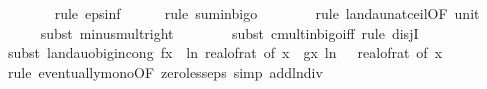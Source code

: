\begin{isabellebody}
\ \ \ \ \ \ \isamarkupfalse%
\ {\isacharparenleft}{\kern0pt}rule\ eps{\isacharunderscore}{\kern0pt}inf{\isacharparenright}{\kern0pt}\isanewline
\ \ \ \ \isamarkupfalse%
\ {\isacharparenleft}{\kern0pt}rule\ sum{\isacharunderscore}{\kern0pt}in{\isacharunderscore}{\kern0pt}bigo{\isacharparenright}{\kern0pt}\isanewline
\ \ \ \ \ \ \isamarkupfalse%
\ {\isacharparenleft}{\kern0pt}rule\ landau{\isacharunderscore}{\kern0pt}nat{\isacharunderscore}{\kern0pt}ceil{\isacharbrackleft}{\kern0pt}OF\ unit{\isacharunderscore}{\kern0pt}{}{\isacharbrackright}{\kern0pt}{\isacharparenright}{\kern0pt}\isanewline
\ \ \ \ \isamarkupfalse%
\ {\isacharparenleft}{\kern0pt}subst\ minus{\isacharunderscore}{\kern0pt}mult{\isacharunderscore}{\kern0pt}right{\isacharparenright}{\kern0pt}\isanewline
\ \ \ \ \ \ \isamarkupfalse%
\ {\isacharparenleft}{\kern0pt}subst\ cmult{\isacharunderscore}{\kern0pt}in{\isacharunderscore}{\kern0pt}bigo{\isacharunderscore}{\kern0pt}iff{\isacharcomma}{\kern0pt}\ rule\ disjI{}{\isacharparenright}{\kern0pt}\isanewline
\ \ \ \ \ \ \isamarkupfalse%
\ {\isacharparenleft}{\kern0pt}subst\ landau{\isacharunderscore}{\kern0pt}o{\isachardot}{\kern0pt}big{\isachardot}{\kern0pt}in{\isacharunderscore}{\kern0pt}cong{\isacharbrackleft}{\kern0pt}\ f{\isacharequal}{\kern0pt}{\isachardoublequoteopen}{\isasymlambda}x{\isachardot}{\kern0pt}\ {\isacharminus}{\kern0pt}\ ln\ {\isacharparenleft}{\kern0pt}real{\isacharunderscore}{\kern0pt}of{\isacharunderscore}{\kern0pt}rat\ {\isacharparenleft}{\kern0pt}{\isasymepsilon}{\isacharunderscore}{\kern0pt}of\ x{\isacharparenright}{\kern0pt}{\isacharparenright}{\kern0pt}{\isachardoublequoteclose}\ \ g{\isacharequal}{\kern0pt}{\isachardoublequoteopen}{\isasymlambda}x{\isachardot}{\kern0pt}\ ln\ {\isacharparenleft}{\kern0pt}{}\ {\isacharslash}{\kern0pt}\ real{\isacharunderscore}{\kern0pt}of{\isacharunderscore}{\kern0pt}rat\ {\isacharparenleft}{\kern0pt}{\isasymepsilon}{\isacharunderscore}{\kern0pt}of\ x{\isacharparenright}{\kern0pt}{\isacharparenright}{\kern0pt}{\isachardoublequoteclose}{\isacharbrackright}{\kern0pt}{\isacharparenright}{\kern0pt}\isanewline
\ \ \ \ \ \ \ \isamarkupfalse%
\ {\isacharparenleft}{\kern0pt}rule\ eventually{\isacharunderscore}{\kern0pt}mono{\isacharbrackleft}{\kern0pt}OF\ zero{\isacharunderscore}{\kern0pt}less{\isacharunderscore}{\kern0pt}eps{\isacharbrackright}{\kern0pt}{\isacharcomma}{\kern0pt}\ simp\ add{\isacharcolon}{\kern0pt}ln{\isacharunderscore}{\kern0pt}div{\isacharparenright}{\kern0pt}\isanewline

\end{isabellebody}
